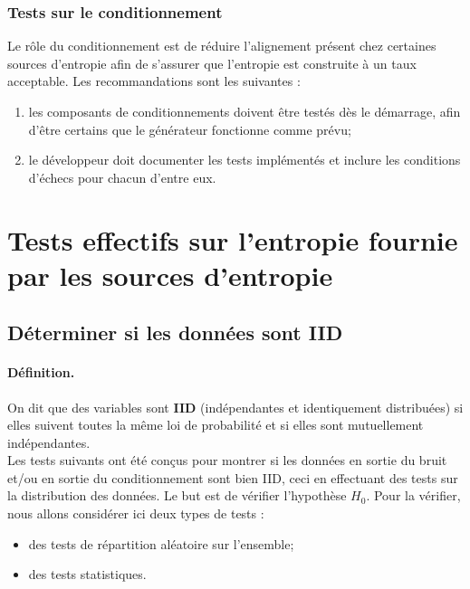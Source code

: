 \subsubsection{Tests sur le conditionnement}
Le rôle du conditionnement est de réduire l'alignement présent chez certaines sources d'entropie afin de s'assurer que l'entropie est construite à un taux acceptable. Les recommandations sont les suivantes :
\begin{enumerate}
\item les composants de conditionnements doivent être testés dès le démarrage, afin d'être certains que le générateur fonctionne comme prévu;
\item le développeur doit documenter les tests implémentés et inclure les conditions d'échecs pour chacun d'entre eux.
\end{enumerate}



\section{Tests effectifs sur l'entropie fournie par les sources d'entropie}

\subsection{Déterminer si les données sont IID}

\paragraph{Définition.\\}
On dit que des variables sont \textbf{IID} (indépendantes et identiquement distribuées) si elles suivent toutes la même loi de probabilité et si elles sont mutuellement indépendantes. \\

Les tests suivants ont été conçus pour montrer si les données en sortie du bruit et/ou en sortie du conditionnement sont bien IID, ceci en effectuant des tests sur la distribution des données. Le but est de vérifier l'hypothèse $H_0$. Pour la vérifier, nous allons considérer ici deux types de tests : 
\begin{itemize}
\item des tests de répartition aléatoire sur l'ensemble;
\item des tests statistiques.\\
\end{itemize}


